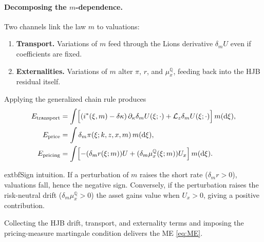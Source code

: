 \documentclass[11pt,letterpaper,oneside]{article}
\newcommand{\diff}{\mathrm{d}}
\newcommand{\Lz}{\mathcal{L}_z}
\newcommand{\muxQ}{\mu_x^{\mathbb{Q}}}
\newcommand{\dmU}{\delta_m U}
\begin{document}
\paragraph{Decomposing the $m$-dependence.}
Two channels link the law $m$ to valuations:
\begin{enumerate}[label=(\roman*), leftmargin=1.5em]
    \item \textbf{Transport.} Variations of $m$ feed through the Lions derivative $\dmU$ even if coefficients are fixed.
    \item \textbf{Externalities.} Variations of $m$ alter $\pi$, $r$, and $\muxQ$, feeding back into the HJB residual itself.
\end{enumerate}
Applying the generalized chain rule produces
\begin{align*}
E_{\text{transport}} &= \int \Bigl[(i^*(\xi,m)-\delta\kappa)\,\partial_{\kappa}\dmU(\xi;\cdot) + \Lz \dmU(\xi;\cdot)\Bigr]\,m(\diff \xi),\\
E_{\text{price}} &= \int \delta_m \pi(\xi; k,z,x,m)\,m(\diff \xi),\\
E_{\text{pricing}} &= \int \Bigl[-(\delta_m r(\xi; m)) U + (\delta_m \muxQ(\xi; m)) U_x \Bigr]\,m(\diff \xi).
\end{align*}

\begin{tcolorbox}[didacticstyle]
      extbf{Sign intuition.} If a perturbation of $m$ raises the short rate ($\delta_m r>0$), valuations fall, hence the negative sign. Conversely, if the perturbation raises the risk-neutral drift ($\delta_m \muxQ>0$) the asset gains value when $U_x>0$, giving a positive contribution.
\end{tcolorbox}

Collecting the HJB drift, transport, and externality terms and imposing the pricing-measure martingale condition delivers the ME \eqref{eq:ME}.
\end{document}
